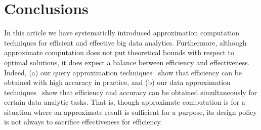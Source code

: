 \section{Conclusions}
\label{sec-conclusion}

In this article we have systematiclly introduced approximation computation techniques for efficient and effective big data analytics.
Furthermore, although approximate computation does not put
theoretical bounds with respect to optimal solutions, it does expect a balance between efficiency and effectiveness. Indeed, (a) our query approximation techniques~\cite{ShuaiMaVLDB12,tods-MaCFHW14,LinMZWH17,MaHWLH17} show that efficiency can be obtained with high accuracy in practice, and (b) our data approximation techniques~\cite{MaFLWCH16,MaFLWCH17,HuAMH16,DuanAMHH16,DuanMAMH17} show that efficiency and accuracy can be obtained simultaneously for certain data analytic tasks. That is, though approximate computation is for a situation where an approximate result is sufficient for a purpose, its design policy is not always to sacrifice effectiveness for efficiency.





